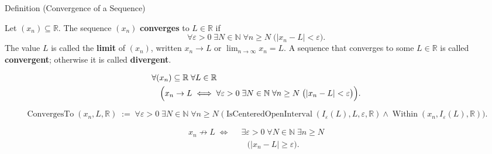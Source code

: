 \begin{definitionbox}{Definition (Convergence of a Sequence)}
\begin{definition}
\label{def:convergent-sequence}

Let $(x_n) \subseteq \mathbb{R}$. The sequence $(x_n)$ \textbf{converges}
to $L \in \mathbb{R}$ if
\[
    \forall \varepsilon > 0 \;\exists N \in \mathbb{N} \;\forall n \ge N
    \;\bigl(|x_n - L| < \varepsilon\bigr).
\]
The value $L$ is called the \textbf{limit} of $(x_n)$, written
$x_n \to L$ or $\displaystyle\lim_{n \to \infty} x_n = L$.
A sequence that converges to some $L \in \mathbb{R}$ is called
\textbf{convergent}; otherwise it is called \textbf{divergent}.
\end{definition}
\end{definitionbox}

\begin{remark*}
\[
\begin{aligned}
&\forall (x_n) \subseteq \mathbb{R} \;\forall L \in \mathbb{R}\\
&\quad\Bigl(
    x_n \to L
    \;\Longleftrightarrow\;
    \forall \varepsilon > 0 \;\exists N \in \mathbb{N} \;\forall n \ge N
    \;\bigl(|x_n - L| < \varepsilon\bigr)
\Bigr).
\end{aligned}
\]
\end{remark*}

\begin{remark*}
\[
\operatorname{ConvergesTo}(x_n,L,\mathbb R)
\;:=\;
\forall \varepsilon > 0 \;\exists N \in \mathbb{N} \;\forall n \ge N
\;\bigl(
  \operatorname{IsCenteredOpenInterval}(I_\varepsilon(L),L,\varepsilon,\mathbb R)
  \wedge
  \operatorname{Within}(x_n,I_\varepsilon(L),\mathbb R)
\bigr).
\]
\end{remark*}

\begin{remark*}
\[
\begin{aligned}
x_n \not\to L
\;\Longleftrightarrow\;
&\;\exists \varepsilon > 0 \;\forall N \in \mathbb{N} \;\exists n \ge N\\
&\quad\bigl(|x_n - L| \ge \varepsilon\bigr).
\end{aligned}
\]
\end{remark*}


